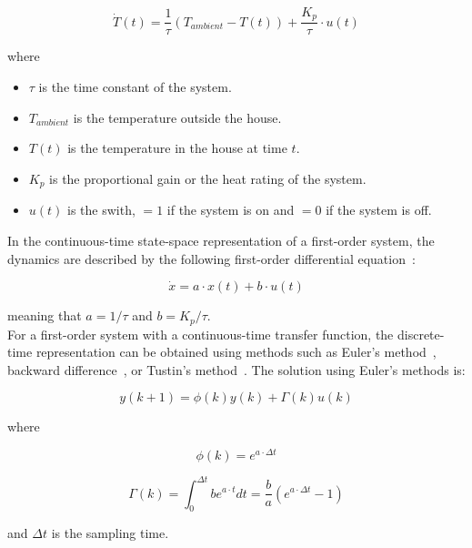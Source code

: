 \begin{equation}
    \dot{T}(t) = \frac{1}{\tau} \left( T_{ambient} - T(t) \right) + \frac{K_{p}}{\tau} \cdot u(t)
\end{equation}

where

\begin{itemize}
    \item $\tau$ is the time constant of the system.

    \item $T_{ambient}$ is the temperature outside the house.

    \item $T(t)$ is the temperature in the house at time $t$.

    \item $K_{p}$ is the proportional gain or the heat rating of the system.

    \item $u(t)$ is the swith, $= 1$ if the system is on and $= 0$ if the system is off. \\
\end{itemize}

In the continuous-time state-space representation of a first-order system, the dynamics are described by the following first-order differential equation~\cite{ayomoh2012}:

\begin{equation}
    \dot{x} = a \cdot x(t) + b \cdot u(t)
\end{equation}

meaning that $a = 1/\tau$ and $b = K_{p}/\tau$. \\

For a first-order system with a continuous-time transfer function, the discrete-time representation can be obtained using methods such as Euler's method~\cite{griffiths2010}, backward difference~\cite{suleiman2011}, or Tustin's method~\cite{phillips1985}. The solution using Euler's methods is:

\begin{equation}
    y(k + 1) = \phi(k) y(k) + \Gamma(k) u(k)
    \label{eq:yk1}
\end{equation}

where

\begin{equation}
    \phi(k) = e^{a \cdot \Delta t}
    \label{eq:phi}
\end{equation}

\begin{equation}
    \Gamma(k) = \int_{0}^{\Delta t}{b} e^{a \cdot t} dt = \frac{b}{a} \left( e^{a \cdot \Delta t} - 1\right)
    \label{eq:gamma}
\end{equation}

and $\Delta t$ is the sampling time.
